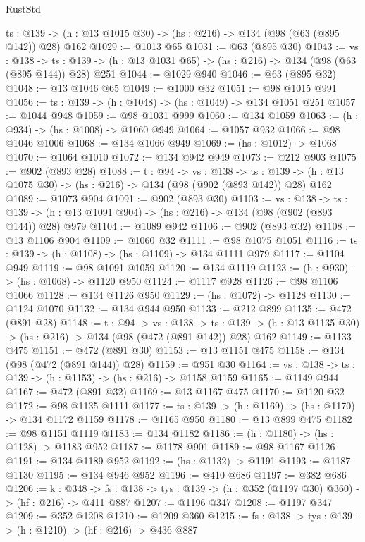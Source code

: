 \begin{lexlean}{RustStd}
\begin{coremodule}
  {ts : @139} -> (h : @13 @1015 @30) -> (hs : @216) -> @134 (@98 (@63 (@895 @142)) @28) @162
@1029 := @1013 @65
@1031 := @63 (@895 @30)
@1043 := {vs : @138} ->
  {ts : @139} -> (h : @13 @1031 @65) -> (hs : @216) -> @134 (@98 (@63 (@895 @144)) @28) @251
@1044 := @1029 @940
@1046 := @63 (@895 @32)
@1048 := @13 @1046 @65
@1049 := @1000 @32
@1051 := @98 @1015 @991
@1056 := {ts : @139} -> (h : @1048) -> (hs : @1049) -> @134 @1051 @251
@1057 := @1044 @948
@1059 := @98 @1031 @999
@1060 := @134 @1059
@1063 := (h : @934) -> (hs : @1008) -> @1060 @949
@1064 := @1057 @932
@1066 := @98 @1046 @1006
@1068 := @134 @1066 @949
@1069 := (hs : @1012) -> @1068
@1070 := @1064 @1010
@1072 := @134 @942 @949
@1073 := @212 @903
@1075 := @902 (@893 @28)
@1088 := {t : @94} ->
  {vs : @138} ->
  {ts : @139} -> (h : @13 @1075 @30) -> (hs : @216) -> @134 (@98 (@902 (@893 @142)) @28) @162
@1089 := @1073 @904
@1091 := @902 (@893 @30)
@1103 := {vs : @138} ->
  {ts : @139} -> (h : @13 @1091 @904) -> (hs : @216) -> @134 (@98 (@902 (@893 @144)) @28) @979
@1104 := @1089 @942
@1106 := @902 (@893 @32)
@1108 := @13 @1106 @904
@1109 := @1060 @32
@1111 := @98 @1075 @1051
@1116 := {ts : @139} -> (h : @1108) -> (hs : @1109) -> @134 @1111 @979
@1117 := @1104 @949
@1119 := @98 @1091 @1059
@1120 := @134 @1119
@1123 := (h : @930) -> (hs : @1068) -> @1120 @950
@1124 := @1117 @928
@1126 := @98 @1106 @1066
@1128 := @134 @1126 @950
@1129 := (hs : @1072) -> @1128
@1130 := @1124 @1070
@1132 := @134 @944 @950
@1133 := @212 @899
@1135 := @472 (@891 @28)
@1148 := {t : @94} ->
  {vs : @138} ->
  {ts : @139} -> (h : @13 @1135 @30) -> (hs : @216) -> @134 (@98 (@472 (@891 @142)) @28) @162
@1149 := @1133 @475
@1151 := @472 (@891 @30)
@1153 := @13 @1151 @475
@1158 := @134 (@98 (@472 (@891 @144)) @28)
@1159 := @951 @30
@1164 := {vs : @138} -> {ts : @139} -> (h : @1153) -> (hs : @216) -> @1158 @1159
@1165 := @1149 @944
@1167 := @472 (@891 @32)
@1169 := @13 @1167 @475
@1170 := @1120 @32
@1172 := @98 @1135 @1111
@1177 := {ts : @139} -> (h : @1169) -> (hs : @1170) -> @134 @1172 @1159
@1178 := @1165 @950
@1180 := @13 @899 @475
@1182 := @98 @1151 @1119
@1183 := @134 @1182
@1186 := (h : @1180) -> (hs : @1128) -> @1183 @952
@1187 := @1178 @901
@1189 := @98 @1167 @1126
@1191 := @134 @1189 @952
@1192 := (hs : @1132) -> @1191
@1193 := @1187 @1130
@1195 := @134 @946 @952
@1196 := @410 @686
@1197 := @382 @686
@1206 := {k : @348} ->
  {fs : @138} -> {tys : @139} -> (h : @352 (@1197 @30) @360) -> (hf : @216) -> @411 @887
@1207 := @1196 @347
@1208 := @1197 @347
@1209 := @352 @1208
@1210 := @1209 @360
@1215 := {fs : @138} -> {tys : @139} -> (h : @1210) -> (hf : @216) -> @436 @887

\end{coremodule}
\end{lexlean}
